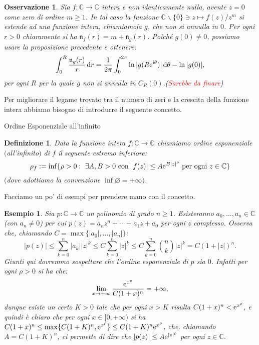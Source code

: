 \documentclass[11pt]{book}
\theoremstyle{Definizione}
\newtheorem*{mydef}{Definizione}
\theoremstyle{TeoremaProposizioneLemmaCorollarioCongettura}
\theoremstyle{OsservazioneNotaEsempio}
\newtheorem{myobs}{Osservazione}[section]
\newtheorem{myes}{Esempio}[section]
\newcommand{\C}{\mathbb{C}}
\newcommand{\tolto}{\smallsetminus}
\renewcommand{\i}{\textup{i}}
\newcommand{\e}{\textup{e}}
\renewcommand{\d}{\mathrm{d}}
\newcommand{\dtheta}{\, \d \theta}
\newcommand{\nzeri}[1][]{\mathfrak{n}_{#1}}
\begin{document}
\begin{myobs}
Sia $f:\C\longrightarrow \C$ intera e non identicamente nulla, avente $z = 0$ come zero di ordine $m\geq 1$. In tal caso la funzione $\C\tolto \{0\}\ni z \longmapsto f(z)/z^m$ si estende ad una funzione intera, chiamiamola $g$, che non si annulla in $0$. Per ogni $r > 0$ chiaramente si ha $\nzeri[f](r) = m + \nzeri[g](r)$. Poiché $g(0)\neq 0$, possiamo usare la proposizione precedente e ottenere:
$$
\int_0^R \frac{\nzeri[g](r)}{r}\,\d r = \frac{1}{2\pi}\int_0^{2\pi} \ln|g(R\e^{\i\theta})|\dtheta-\ln|g(0)|,
$$
per ogni $R$ per la quale $g$ non si annulla in $C_R(0)$.(\textcolor{red}{Sarebbe da finare})

\end{myobs}
Per migliorare il legame trovato tra il numero di zeri e la crescita della funzione intera abbiamo bisogno di introdurre il seguente concetto.
\begin{boxdef}{Ordine Esponenziale all'infinito}
\begin{mydef}
Data la funzione intera $f:\C\longrightarrow \C$ chiamiamo ordine esponenziale $($all'infinito$)$ di $f$ il seguente estremo inferiore:
$$
\rho_f := \inf\{\rho > 0:\ \exists A,B > 0 \textup{ con }|f(z)| \leq A\e^{B|z|^\rho} \textup{ per ogni }z\in \C\}
$$
$($dove adottiamo la convenzione $\inf\varnothing = +\infty)$.
\end{mydef}
\end{boxdef}
\noindent
Facciamo un po' di esempi per prendere mano con il concetto.
\begin{myes}\label{es:OrdineEsponenzialePolinomio}
Sia $p:\C\longrightarrow \C$ un polinomio di grado $n\geq 1$. Esisteranno $a_0,\dots,a_n\in \C$ (con $a_n \neq 0$) per cui $p(z) = a_nz^n+\cdots+a_1 z+ a_0$ per ogni $z$ complesso. Osserva che, chiamando $C = \max\{|a_0|,\dots,|a_n|\}$:
$$
|p(z)| \leq  \sum_{k = 0}^n |a_k||z|^k\leq C \sum_{k = 0}^n |z|^k \leq C \sum_{k = 0}^n \binom{n}{k} |z|^k = C(1+|z|)^n.
$$
Giunti qui dovremmo sospettare che l'ordine esponenziale di $p$ sia $0$. Infatti per ogni $\rho > 0$ si ha che:
$$
\lim_{x \to +\infty} \frac{\e^{x^\rho}}{C(1+x)^n} = +\infty,
$$
dunque esiste un certo $K > 0$ tale che per ogni $x > K$ risulta $C(1+x)^n < \e^{x^\rho}$, e quindi è chiaro che per ogni $x\in [0,+\infty)$ si ha $C(1+x)^n \leq \max\{C(1+K)^n,\e^{x^\rho}\} \leq C(1+K)^n\e^{x^\rho}$, che, chiamando $A = C(1+K)^n$, ci permette di dire che $|p(z)| \leq A\e^{|z|^\rho}$ per ogni $z\in \C$.
\end{myes}
\end{document}

